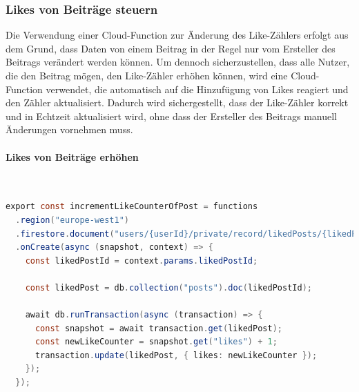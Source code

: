 \subsubsection{Likes von Beiträge steuern}

Die Verwendung einer Cloud-Function zur Änderung des Like-Zählers erfolgt aus dem Grund, dass Daten von einem Beitrag in der Regel nur vom Ersteller des Beitrags verändert werden können. Um dennoch sicherzustellen, dass alle Nutzer, die den Beitrag mögen, den Like-Zähler erhöhen können, wird eine Cloud-Function verwendet, die automatisch auf die Hinzufügung von Likes reagiert und den Zähler aktualisiert. Dadurch wird sichergestellt, dass der Like-Zähler korrekt und in Echtzeit aktualisiert wird, ohne dass der Ersteller des Beitrags manuell Änderungen vornehmen muss.

\paragraph{Likes von Beiträge erhöhen}\mbox{} \\

\begin{lstlisting}[language=Java,caption=incrementLikeCounterOfPost Funktion,label=lst:incrementLikePostFunction]
  export const incrementLikeCounterOfPost = functions
  .region("europe-west1")
  .firestore.document("users/{userId}/private/record/likedPosts/{likedPostId}")
  .onCreate(async (snapshot, context) => {
    const likedPostId = context.params.likedPostId;

    const likedPost = db.collection("posts").doc(likedPostId);

    await db.runTransaction(async (transaction) => {
      const snapshot = await transaction.get(likedPost);
      const newLikeCounter = snapshot.get("likes") + 1;
      transaction.update(likedPost, { likes: newLikeCounter });
    });
  });
\end{lstlisting}


